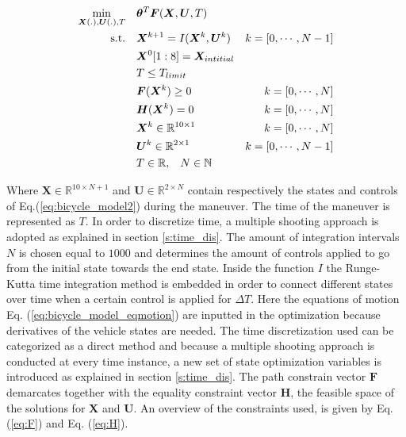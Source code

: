 
\begin{equation}\label{opt:basic_opti_w}
\begin{aligned}
\min_{\bm{X}(.),\bm{U}(.), T} \quad &  \bm{\theta}^T\bm{F}(\bm{X},\bm{U}, T) \\
\textrm{s.t.} \quad & \bm{X}^{k+1} = I(\bm{X}^{k}, \bm{U}^{k}) & k = [0,\cdots, N-1]\\
& \bm{X}^{0}[1:8]= \bm{X}_{intitial} \\
& T \leq T_{limit}\\
& \bm{F}(\bm{X}^{k}) \geq 0	& k = [0,\cdots, N]\\
& \bm{H}(\bm{X}^{k}) = 0	& k = [0,\cdots, N]\\
& \bm{X}^{k}\in \mathbb{R}^{10\times 1}  & k = [0,\cdots, N]\\
& \bm{U}^{k}\in \mathbb{R}^{2\times 1} \hspace{3 mm} & k = [0,\cdots, N-1]\\
& T \in \mathbb{R},\hspace{3 mm} N \in \mathbb{N}
\end{aligned}
\end{equation}

Where $\bm{X} \in \mathbb{R}^{10\times N+1}$ and $\bm{U}\in \mathbb{R}^{2\times N}$ contain respectively the states and controls of Eq.(\ref{eq:bicycle_model2}) during the maneuver. The time of the maneuver is represented as $T$. In order to discretize time, a multiple shooting approach is adopted as explained in section \ref{s:time_dis}. The amount of integration intervals $N$ is chosen equal to $1000$ and determines the  amount of controls applied to go from the initial state towards the end state. 
Inside the function $I$ the Runge-Kutta time integration method is embedded in order to connect different states over time when a certain control is applied for $\Delta T$. Here the equations of motion Eq. (\ref{eq:bicycle_model_eqmotion}) are inputted in the optimization because derivatives of the vehicle states are needed. The time discretization used can be categorized as a direct method and because a multiple shooting approach is conducted at every time instance, a new set of state optimization variables is introduced as explained in section \ref{s:time_dis}. The path constrain vector $\bm{F}$ demarcates together with the equality constraint vector $\bm{H}$, the feasible space of the solutions for $\bm{X}$ and $\bm{U}$. An overview of the constraints used, is given by Eq. (\ref{eq:F}) and Eq. (\ref{eq:H}).

